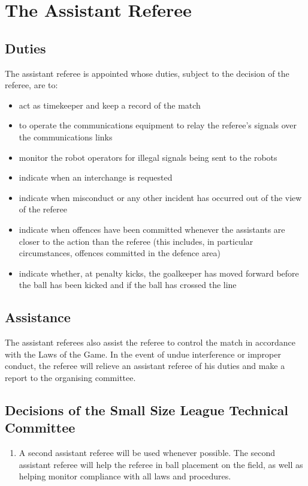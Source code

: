 \section{The Assistant Referee}\label{sec:assistant-referee}

\subsection{Duties}
The assistant referee is appointed whose duties, subject to the decision of the referee, are to:
\begin{itemize}
\item act as timekeeper and keep a record of the match
\item to operate the communications equipment to relay the referee's signals over the communications links
\item monitor the robot operators for illegal signals being sent to the robots
\item indicate when an interchange is requested
\item indicate when misconduct or any other incident has occurred out of the view of the referee
\item indicate when offences have been committed whenever the assistants are closer to the action than the referee (this includes, in particular circumstances, offences committed in the defence area)
\item indicate whether, at penalty kicks, the goalkeeper has moved forward before the ball has been kicked and if the ball has crossed the line
\end{itemize}

\subsection{Assistance}
The assistant referees also assist the referee to control the match in accordance with the Laws of the Game.
In the event of undue interference or improper conduct, the referee will relieve an assistant referee of his duties and make a report to the organising committee.

\subsection*{Decisions of the Small Size League Technical Committee}
\begin{enumerate}
\item
A second assistant referee will be used whenever possible.
The second assistant referee will help the referee in ball placement on the field, as well as helping monitor compliance with all laws and procedures.
\end{enumerate}
